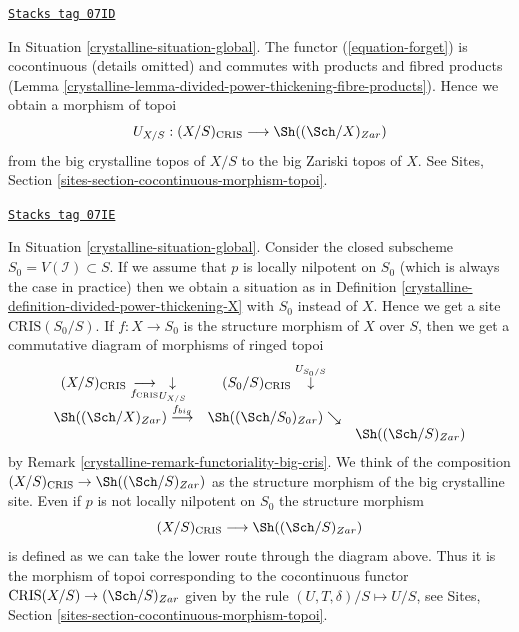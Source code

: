 \begin{remark}

\label{crystalline-remark-compare-big-zariski}
\href{https://stacks.math.columbia.edu/tag/07ID}{\texttt{Stacks tag 07ID}}

In Situation \ref{crystalline-situation-global}.
The functor (\ref{equation-forget}) is cocontinuous (details omitted) and
commutes with products and fibred products
(Lemma \ref{crystalline-lemma-divided-power-thickening-fibre-products}).
Hence we obtain a morphism of topoi
$$
U_{X/S} : (X/S)_{\text{CRIS}} \longrightarrow \Sh((\Sch/X)_{Zar})
$$
from the big crystalline topos of $X/S$ to the big Zariski topos of $X$.
See Sites, Section \ref{sites-section-cocontinuous-morphism-topoi}.
\end{remark}

\begin{remark}

\label{crystalline-remark-big-structure-morphism}
\href{https://stacks.math.columbia.edu/tag/07IE}{\texttt{Stacks tag 07IE}}

In Situation \ref{crystalline-situation-global}.
Consider the closed subscheme $S_0 = V(\mathcal{I}) \subset S$.
If we assume that $p$ is locally nilpotent on $S_0$ (which is always
the case in practice) then we obtain a situation as in
Definition \ref{crystalline-definition-divided-power-thickening-X} with $S_0$ instead
of $X$. Hence we get a site $\text{CRIS}(S_0/S)$. If $f : X \to S_0$ is
the structure morphism of $X$ over $S$, then we get a commutative diagram
of morphisms of ringed topoi
$$
\begin{array}{ccc}(X/S)_{\text{CRIS}}
\underset{f_{\text{CRIS}}}{\longrightarrow}\underset{U_{X/S}}{\downarrow} & (S_0/S)_{\text{CRIS}} \overset{U_{S_0/S}}{\downarrow} &  \\ \Sh((\Sch/X)_{Zar}) \overset{f_{big}}{\longrightarrow} & \Sh((\Sch/S_0)_{Zar}) \searrow &  \\  &  & \Sh((\Sch/S)_{Zar})\end{array}
$$
by Remark \ref{crystalline-remark-functoriality-big-cris}. We think of the composition
$(X/S)_{\text{CRIS}} \to \Sh((\Sch/S)_{Zar})$ as the structure morphism of
the big crystalline site. Even if $p$ is not locally nilpotent on $S_0$
the structure morphism
$$
(X/S)_{\text{CRIS}} \longrightarrow \Sh((\Sch/S)_{Zar})
$$
is defined as we can take the lower route through the diagram above. Thus it
is the morphism of topoi corresponding to the cocontinuous
functor $\text{CRIS}(X/S) \to (\Sch/S)_{Zar}$ given by the rule
$(U, T, \delta)/S \mapsto U/S$, see
Sites, Section \ref{sites-section-cocontinuous-morphism-topoi}.
\end{remark}

